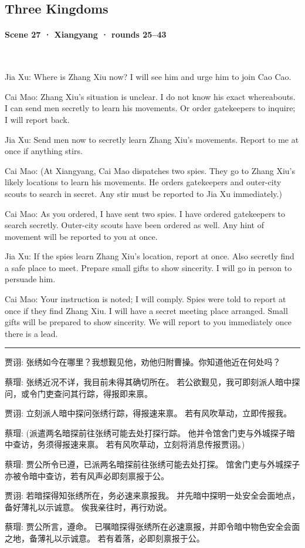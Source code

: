 \subsection*{Three Kingdoms}
\paragraph{Scene 27 · Xiangyang · rounds 25–43}\mbox{}\\[2pt]
\begin{zhblock}\small\setlength{\parskip}{3pt}
Jia Xu:
Where is Zhang Xiu now?
I will see him and urge him to join Cao Cao.
\par Cai Mao:
Zhang Xiu's situation is unclear.
I do not know his exact whereabouts.
I can send men secretly to learn his movements.
Or order gatekeepers to inquire; I will report back.
\par Jia Xu:
Send men now to secretly learn Zhang Xiu's movements.
Report to me at once if anything stirs.
\par Cai Mao:
(At Xiangyang, Cai Mao dispatches two spies. They go to Zhang Xiu's likely locations to learn his movements. He orders gatekeepers and outer-city scouts to search in secret. Any stir must be reported to Jia Xu immediately.)
\par Cai Mao:
As you ordered, I have sent two spies.
I have ordered gatekeepers to search secretly.
Outer-city scouts have been ordered as well.
Any hint of movement will be reported to you at once.
\par Jia Xu:
If the spies learn Zhang Xiu's location, report at once.
Also secretly find a safe place to meet.
Prepare small gifts to show sincerity.
I will go in person to persuade him.
\par Cai Mao:
Your instruction is noted; I will comply.
Spies were told to report at once if they find Zhang Xiu.
I will have a secret meeting place arranged.
Small gifts will be prepared to show sincerity.
We will report to you immediately once there is a lead.
\par\textcolor{gray}{\rule{0.3\textwidth}{0.4pt}}\par
{\color{gray} 贾诩:
张绣如今在哪里？我想觐见他，劝他归附曹操。你知道他近在何处吗？
\par 蔡瑁:
张绣近况不详，我目前未得其确切所在。
若公欲觐见，我可即刻派人暗中探问，或令门吏查问其行踪，得报即来禀。
\par 贾诩:
立刻派人暗中探问张绣行踪，得报速来禀。
若有风吹草动，立即传报我。
\par 蔡瑁:
(派遣两名暗探前往张绣可能去处打探行踪。 他并令馆舍门吏与外城探子暗中查访，务须得报速来禀。 若有风吹草动，立刻将消息传报贾诩。)
\par 蔡瑁:
贾公所令已遵，已派两名暗探前往张绣可能去处打探。
馆舍门吏与外城探子亦被令暗中查访，若有风声必即刻禀报于公。
\par 贾诩:
若暗探得知张绣所在，务必速来禀报我。
并先暗中探明一处安全会面地点，备好薄礼以示诚意。
俟我亲往时，再行劝说。
\par 蔡瑁:
贾公所言，遵命。
已嘱暗探得张绣所在必速禀报，并即令暗中物色安全会面之地，备薄礼以示诚意。
若有着落，必即刻禀报于公。}
\end{zhblock}
